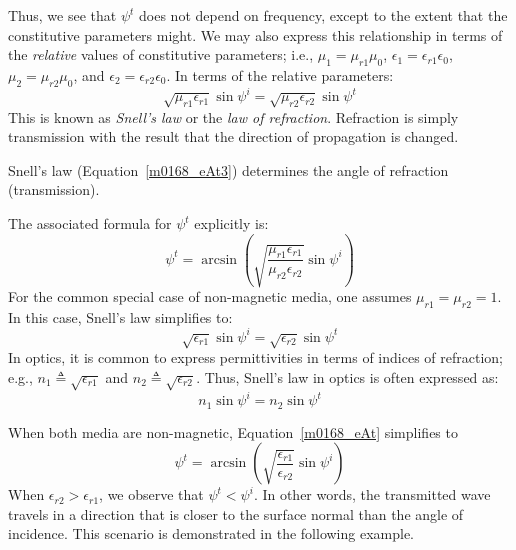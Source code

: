 %
Thus, we see that $\psi^t$ does not depend on frequency, except to the extent that the constitutive parameters might.
We may also express this relationship in terms of the \emph{relative} values of constitutive parameters; i.e.,
$\mu_1=\mu_{r1}\mu_0$, 
$\epsilon_1=\epsilon_{r1}\epsilon_0$, 
$\mu_2=\mu_{r2}\mu_0$, and
$\epsilon_2=\epsilon_{r2}\epsilon_0$.
In terms of the relative parameters:
%
\begin{equation}
\boxed{ \sqrt{\mu_{r1}\epsilon_{r1}} \sin\psi^i = \sqrt{\mu_{r2}\epsilon_{r2}} \sin\psi^t }
\label{m0168_eAt3}
\end{equation}
%
This is known as \emph{Snell's law}
or the \emph{law of refraction}.
Refraction
is simply transmission with the result that the direction of propagation is changed.
%
\begin{mdframed}[backgroundcolor=yellow!20,nobreak=true] 
Snell's law (Equation~\ref{m0168_eAt3}) determines the angle of refraction (transmission).
\end{mdframed}
%
The associated formula for $\psi^t$ explicitly is:
%
\begin{equation}
\psi^t = \arcsin\left(\sqrt{\frac{\mu_{r1}\epsilon_{r1}}{\mu_{r2}\epsilon_{r2}}} \sin\psi^i \right)  
\label{m0168_eAt}
\end{equation}
%
For the common special case of non-magnetic media, one assumes $\mu_{r1}=\mu_{r2}= 1$. 
In this case, Snell's law simplifies to:
%
\begin{equation}
\sqrt{\epsilon_{r1}} \sin\psi^i = \sqrt{\epsilon_{r2}} \sin\psi^t
\label{m0168_eAtnm}
\end{equation}
%
In optics, it is common to express permittivities in terms of indices of refraction; 
e.g., 
$n_1\triangleq\sqrt{\epsilon_{r1}}$ and
$n_2\triangleq\sqrt{\epsilon_{r2}}$.
Thus, Snell's law in optics is often expressed as:
%
\begin{equation}
n_1 \sin\psi^i = n_2 \sin\psi^t
\label{m0168_eAtnmo}
\end{equation}

When both media are non-magnetic, Equation~\ref{m0168_eAt} simplifies to
%
\begin{equation}
\psi^t = \arcsin\left(\sqrt{\frac{\epsilon_{r1}}{\epsilon_{r2}}} \sin\psi^i \right)  
\label{m0168_eAt2}
\end{equation}
%
When $\epsilon_{r2}>\epsilon_{r1}$, we observe that $\psi^t < \psi^i$.  
In other words, the transmitted wave travels in a direction that is closer to the surface normal than the angle of incidence. 
This scenario is demonstrated in the following example.

